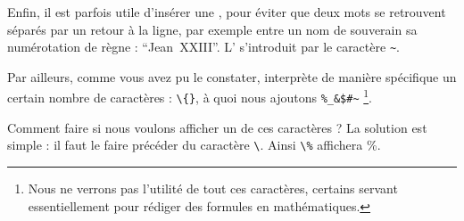 Enfin, il est parfois utile d'insérer une , pour éviter que deux mots se retrouvent séparés par un retour à la ligne, par exemple entre un nom de souverain sa numérotation de règne : \enquote{Jean~XXIII}.  L' s'introduit par le caractère \verb|~|.












Par ailleurs, comme vous avez pu le constater, \logiciel{\LaTeX} interprète de manière spécifique un certain nombre de caractères : \verb|\{}|, à quoi nous ajoutons \verb|%_&$#~| \footnote{Nous ne verrons pas l'utilité \logiciel{\LaTeX}  de tout ces caractères, certains servant essentiellement pour rédiger des formules en mathématiques.}.

Comment faire si nous voulons afficher un de ces caractères ? La solution est simple : il faut le faire précéder du caractère \verb|\|. Ainsi \verb|\%| affichera \%.   




